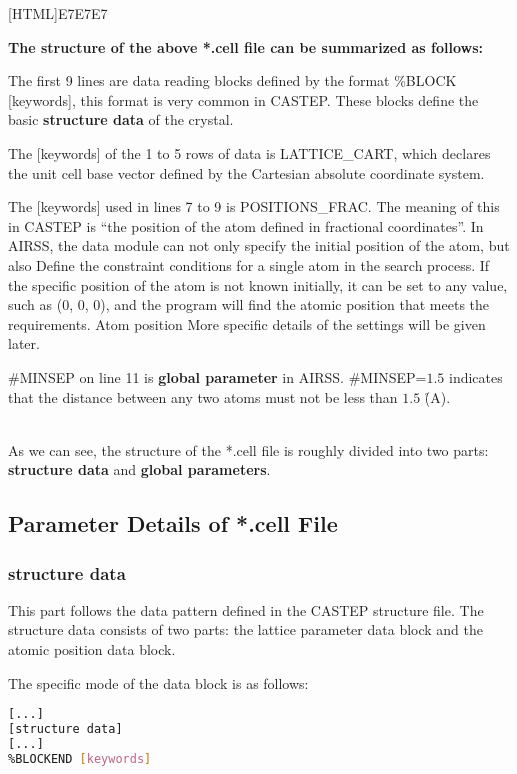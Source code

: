\documentclass[a4paper, 10pt]{article}
\begin{document}
\noindent{}[HTML]{E7E7E7}{\parbox{\textwidth}{%
\noindent \textbf{The structure of the above *.cell file can be summarized as follows:}
\begin{maineu}
  \item The first 9 lines are data reading blocks defined by the format \%BLOCK [keywords], this format is very common in CASTEP. These blocks define the basic \textbf{structure data} of the crystal. 
  \item The [keywords] of the 1 to 5 rows of data is LATTICE\_CART, which declares the unit cell base vector defined by the Cartesian absolute coordinate system.
  \item The [keywords] used in lines 7 to 9 is POSITIONS\_FRAC. The meaning of this in CASTEP is ``the position of the atom defined in fractional coordinates''. In AIRSS, the data module can not only specify the initial position of the atom, but also Define the constraint conditions for a single atom in the search process. If the specific position of the atom is not known initially, it can be set to any value, such as (0, 0, 0), and the program will find the atomic position that meets the requirements. Atom position More specific details of the settings will be given later.
  \item \#MINSEP on line 11 is \textbf{global parameter} in AIRSS. \#MINSEP=\(1.5\) indicates that the distance between any two atoms must not be less than \(1.5\) \r(A).
\end{maineu}}}\\


As we can see, the structure of the *.cell file is roughly divided into two parts: \textbf{structure data} and \textbf{global parameters}.

\subsection{Parameter Details of *.cell File}
\subsubsection{structure data}
This part follows the data pattern defined in the CASTEP structure file. The structure data consists of two parts: the lattice parameter data block and the atomic position data block.


The specific mode of the data block is as follows:
\begin{lstlisting}[language={bash}]
%BLOCK [keywords]
[...]
[structure data]
[...]
%BLOCKEND [keywords]
\end{lstlisting}
\end{document}
